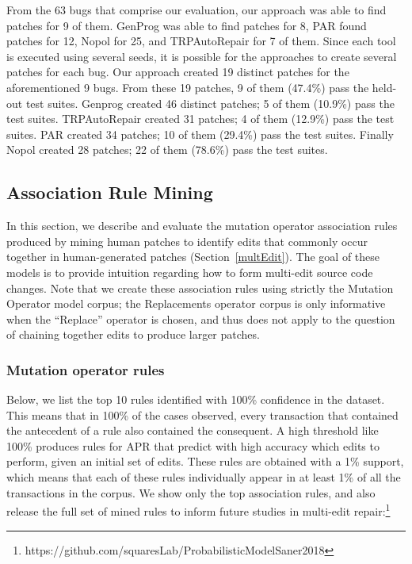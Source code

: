 \documentclass[conference]{IEEEtran}
\begin{document}
From the 63 bugs that comprise our evaluation, our approach was able to find 
patches for 9 of them. 
GenProg was able to find patches for 8, PAR found patches
for 12, Nopol for 25, and TRPAutoRepair for 7 of them.
Since each tool is executed using several seeds, it is possible for the approaches to create
several patches for each bug. 
Our approach created 19 distinct patches for the aforementioned 9 bugs.
From these 19 patches, 9 of them (47.4\%) pass the held-out test suites.
Genprog created 46 distinct patches; 5 of them (10.9\%) pass the test suites.
TRPAutoRepair created 31 patches; 4 of them (12.9\%) pass the test suites.
PAR created 34 patches; 10 of them (29.4\%) pass the test suites. 
Finally Nopol created 28 patches; 22 of them (78.6\%) pass the test suites.

\subsection{Association Rule Mining} \label{armRes}

In this section, we
describe and evaluate the mutation operator association rules produced by
mining human patches to identify edits that commonly occur together in
human-generated patches (Section~\ref{multEdit}).  The goal of these models is
to provide intuition regarding how to form multi-edit source code changes.  Note
that we create these association rules using strictly the Mutation Operator
model corpus; the Replacements operator corpus is only informative when the
``Replace'' operator is chosen, and thus does not apply to the
question of chaining together edits to produce larger patches.

\subsubsection{Mutation operator rules} \label{mutOpRules} Below, we list the
top 10 rules identified with 100\% confidence in the dataset. This means that in
100\% of the cases observed, every transaction that contained the antecedent of
a rule also contained the consequent. A high threshold like 100\% produces
rules for APR that predict with high accuracy which edits to perform, given an
initial set of edits.  These rules are obtained with a 1\% support, which means that
each of these rules individually appear in at least 1\% of all the transactions
in the corpus. We show only the top
association rules, and also release the full set of mined rules to inform future
studies in multi-edit repair:\footnote{https://github.com/squaresLab/ProbabilisticModelSaner2018}
\end{document}
